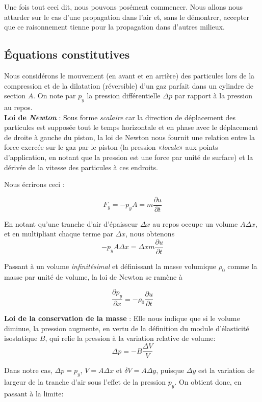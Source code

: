Une fois tout ceci dit, nous pouvons posément commencer. Nous allons nous attarder sur le cas d'une propagation dans l'air et, sans le démontrer, accepter que ce raisonnement tienne pour la propagation dans 
d'autres milieux.

\subsection{Équations constitutives} 

Nous considérons le mouvement (en avant et en arrière) des particules  lors de la compression et de la dilatation (réversible) d'un gaz parfait dans un cylindre de section $A$. On note par $p_{y}$ la pression différentielle $\Delta p$ par rapport à la pression au repos.\\

\textbf{Loi de \textit{Newton}} : Sous forme \textit{scalaire} car la direction de déplacement des particules est supposée tout le temps horizontale et en phase avec le déplacement
de droite à gauche du piston, la loi de Newton nous fournit une relation entre la force exercée sur le gaz par le piston (la pression «\textit{locale}» aux points d'application, en notant que la pression est une force par unité de surface) et la dérivée de la vitesse des particules à ces endroits.

Nous écrirons ceci : 

$$F_{y} = -p_{y} A = m \frac{\partial{u}}{\partial t}$$ 

En notant qu'une tranche d'air d'épaisseur $\Delta x$  au repos occupe un volume $A\Delta x$, et en multipliant chaque terme par $\Delta x$, nous obtenons 
$$-p_{y} A\Delta x = \Delta x m \frac{\partial{u}}{\partial t}$$ 

Passant à  un volume \textit{infinitésimal} et définissant la masse volumique 
$\rho_{0}$ comme la masse par unité de volume, la loi de Newton se ramène à

\[\frac{\partial p_{y}}{\partial x} = - \rho_{0} \frac{\partial{u}}{\partial t}\]


\textbf{Loi de la conservation de la masse}  : Elle nous indique que si le volume diminue, la pression augmente, en vertu de la définition du module d'élasticité isostatique $B$, qui relie la pression à la variation relative de volume:
\[\Delta p  = - B \frac{\Delta V}{V} \]

Dans notre cas, $\Delta p = p_y$, $V = A \Delta x$ et $\delta V = A \Delta y$, puisque $\Delta y$ est la variation de largeur de la tranche d'air sous l'effet de la pression $p_y$. On obtient donc, en passant à la limite:

